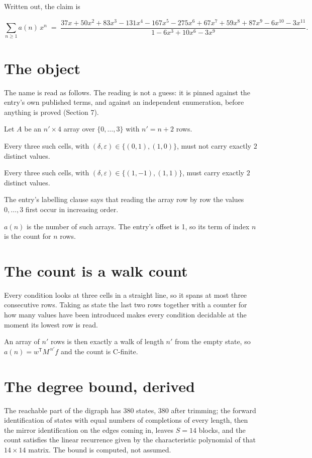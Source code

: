 \documentclass[11pt]{article}
\theoremstyle{definition}
\begin{document}
Written out, the claim is

\[\sum_{n \ge 1} a(n)\,x^n \;=\; \frac{37x + 50x^{2} + 83x^{3} - 131x^{4} - 167x^{5} - 275x^{6} + 67x^{7} + 59x^{8} + 87x^{9} - 6x^{10} - 3x^{11}}{1 - 6x^{3} + 10x^{6} - 3x^{9}}.\]

\section{The object}

The name is read as follows. The reading is not a guess: it is pinned against the entry's own published terms, and against an independent enumeration, before anything is proved (Section 7).

Let $A$ be an $n' \times 4$ array over $\{0,\dots,3\}$ with $n' = n + 2$ rows.

Every three such cells, with $(\delta,\varepsilon) \in \{(0,1), (1,0)\}$, must not carry exactly $2$ distinct values.

Every three such cells, with $(\delta,\varepsilon) \in \{(1,-1), (1,1)\}$, must carry exactly $2$ distinct values.

The entry's labelling clause says that reading the array row by row the values $0,\dots,3$ first occur in increasing order.

$a(n)$ is the number of such arrays. The entry's offset is 1, so its term of index $n$ is the count for $n$ rows.

\section{The count is a walk count}

Every condition looks at three cells in a straight line, so it spans at most three consecutive rows. Taking as state the last two rows together with a counter for how many values have been introduced makes every condition decidable at the moment its lowest row is read.

An array of $n'$ rows is then exactly a walk of length $n'$ from the empty state, so $a(n) = w^{\mathsf T}M^{\,n'}f$ and the count is C-finite.

\section{The degree bound, derived}

The reachable part of the digraph has $380$ states, $380$ after trimming; the forward identification of states with equal numbers of completions of every length, then the mirror identification on the edges coming in, leaves $S = 14$ blocks, and the count satisfies the linear recurrence given by the characteristic polynomial of that $14\times14$ matrix. The bound is computed, not assumed.
\end{document}
